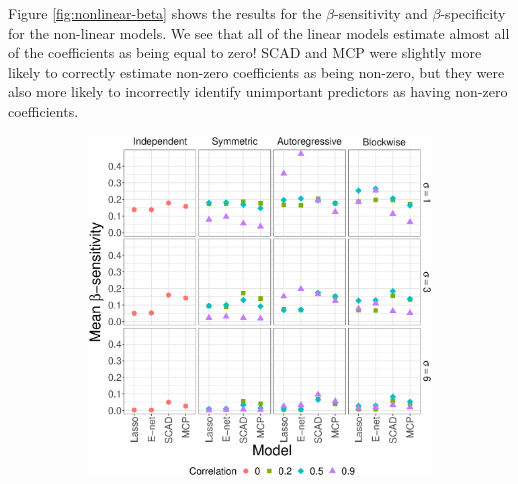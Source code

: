 \documentclass[final,onefignum,onetabnum]{siuro210301}
\begin{document}
	Figure \ref{fig:nonlinear-beta} shows the results for the $\beta$-sensitivity and $\beta$-specificity for the non-linear models. We see that all of the linear models estimate almost all of the coefficients as being equal to zero! SCAD and MCP were slightly more likely to correctly estimate non-zero coefficients as being non-zero, but they were also more likely to incorrectly identify unimportant predictors as having non-zero coefficients.
	\begin{figure}[!htb]
		\centering
		\begin{subfigure}[b]{0.47\textwidth}
			\includegraphics[width=\textwidth]{images/facet/publication_facet_sensitivity_nonlinear_50_2000.eps}
			\label{fig:nonlinear-sensitivity}
		\end{subfigure}
		\hspace{6pt}
		\begin{subfigure}[b]{0.47\textwidth}

\end{subfigure}
\end{figure}
\end{document}
